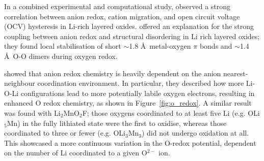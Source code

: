 \documentclass[../main.tex]{subfiles}
\begin{document}
In a combined experimental and computational study, \citeauthor{Gent2017} observed a strong correlation between anion redox, cation migration, and open circuit voltage (OCV) hysteresis in Li-rich layered oxides.\cite{Gent2017} \citeauthor{Hong2019} offered an explanation for the strong coupling between anion redox and structural disordering in Li rich layered oxides; they found local stabilisation of short $\sim$1.8 \AA \ metal-oxygen $\pi$ bonds and $\sim$1.4 \AA \ O-O dimers during oxygen redox.\cite{Hong2019}

\citeauthor{Seo2016} showed that anion redox chemistry is heavily dependent on the anion nearest-neighbour coordination environment.\cite{Seo2016} In particular, they described how more Li-O-Li configurations lead to more potentially labile oxygen electrons, resulting in enhanced O redox chemistry, as shown in Figure~\ref{fig:o_redox}. A similar result was found with Li$_2$MnO$_2$F; those oxygens coordinated to at least five Li (e.g. OLi$_5$Mn) in the fully lithiated state were the first to oxidise, whereas those coordinated to three or fewer (e.g. OLi$_3$Mn$_3$) did not undergo oxidation at all. This showcased a more continuous variation in the O-redox potential, dependent on the number of Li coordinated to a given O$^{2-}$ ion.\cite{Sharpe2020} \cite{Davies2020}
\end{document}
